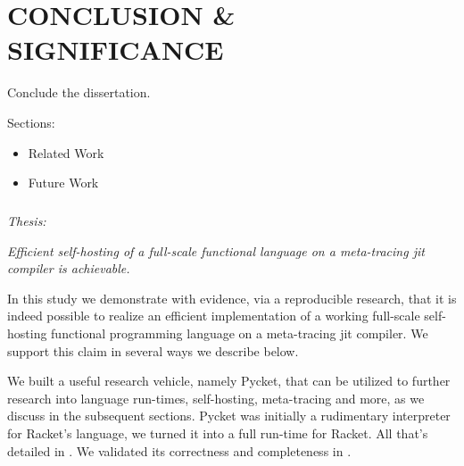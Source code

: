 \chapter[\texorpdfstring{CONCLUSION \& SIGNIFICANCE}
                          {8. Conclusion}]{CONCLUSION \& SIGNIFICANCE}

    \label{chapter:conclusion}

    \begin{chaptersynopsis}
        Conclude the dissertation.

        \vspace{2em}

        Sections:
		\begin{itemize}
			\item Related Work
			\item Future Work
		\end{itemize}
    \end{chaptersynopsis}

    \paragraph{} \textit{Thesis:}

    \textit{Efficient self-hosting of a full-scale functional language on a meta-tracing \gls{jit} compiler is achievable.}

    \begin{paragraph-here}%
        In this study we demonstrate with evidence, via a reproducible research, that it is indeed possible to realize an efficient implementation of a working full-scale self-hosting functional programming language on a meta-tracing \gls{jit} compiler. We support this claim in several ways we describe below.
    \end{paragraph-here}

    \begin{paragraph-here}%
        We built a useful research vehicle, namely Pycket, that can be utilized to further research into language run-times, self-hosting, meta-tracing and more, as we discuss in the subsequent sections. Pycket was initially a rudimentary interpreter for Racket's  language, we turned it into a full run-time for Racket. All that's detailed in . We validated its correctness and completeness in . %
    \end{paragraph-here}

